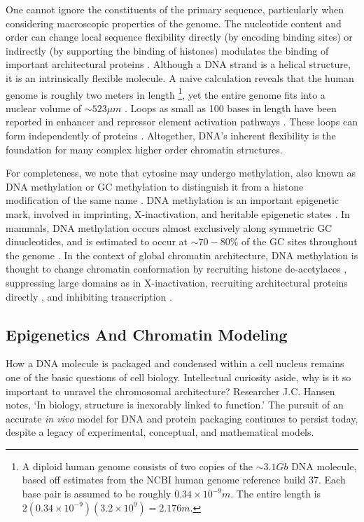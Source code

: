 One cannot ignore the constituents of the primary sequence, particularly when considering macroscopic properties of the genome.  The nucleotide content and
order can change local sequence flexibility directly (by encoding binding sites) or indirectly (by supporting the binding of histones)
modulates the binding of important architectural proteins \citep{travers2004}.  Although a \gls{DNA} strand is a helical structure, it is an intrinsically
flexible molecule.  A naive calculation reveals that the human genome is roughly two meters in length%
\footnote{%
  A diploid human genome consists of two copies of the $\sim3.1Gb$ DNA molecule, based off estimates from the \gls{NCBI} human genome reference build 37.
  Each base pair is assumed to be roughly $0.34\times10^{-9}m$.  The entire length is $2(0.34 \times 10^{-9})(3.2 \times 10^9) = 2.176m$.
},
yet the entire genome fits into a nuclear volume of $\sim523\mu{}m$ \citep{marks2011}.  Loops as small as 100 bases in length have been
reported in enhancer and repressor element activation pathways \citep{wong2008}. These loops can form independently of proteins \citep{vafabakhsh2012}.
Altogether, \gls{DNA}'s inherent flexibility is the foundation for  many complex higher order chromatin structures.

For completeness, we note that cytosine may undergo methylation, also known as \gls{DNA} methylation or GC methylation to distinguish it
from a histone modification of the same name \citep{bird2002}.  \gls{DNA} methylation is an important epigenetic mark, involved in imprinting,
\gls{X-inactivation}, and heritable epigenetic states \citep{law2010}.  In mammals, \gls{DNA} methylation occurs almost exclusively along
symmetric \gls{GC} dinucleotides, and is estimated to occur at $\sim70-80\%$ of the \gls{GC} sites throughout the genome \citep{ehrlich1982,law2010}.
In the context of global chromatin architecture, \gls{DNA} methylation is thought to change chromatin conformation by recruiting histone
de-acetylaces \citep{schubeler2000}, suppressing large domains as in X-inactivation, recruiting architectural proteins directly \citep{yu2000},
and inhibiting transcription \citep{kass1997}.

\subsection*{Epigenetics And Chromatin Modeling}

How a \gls{DNA} molecule is packaged and condensed within a cell nucleus remains one of the basic questions of cell biology.  Intellectual curiosity aside,
why is it so important to unravel the chromosomal architecture?  Researcher J.C. Hansen notes, `In biology, structure is inexorably linked to function.' \citep{hansen2012}
The pursuit of an accurate \textit{\gls{in vivo}} model for \gls{DNA} and protein packaging continues to persist today, despite a legacy of experimental,
conceptual, and mathematical models.

